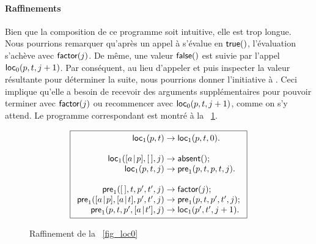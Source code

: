 \paragraph{Raffinements}

Bien que la composition de ce programme soit intuitive, elle est trop
longue. Nous pourrions remarquer qu'après un appel à
 s'évalue en \(\textsf{true}()\),
l'évaluation s'achève avec \(\textsf{factor}(j)\). De même, une valeur
\(\textsf{false}()\) est suivie par l'appel
\(\textsf{loc}_0(p,t,j+1)\). Par
conséquent, au lieu d'appeler  et puis inspecter la valeur
résultante pour déterminer la suite, nous pourrions donner
l'initiative à . Ceci implique qu'elle a besoin de recevoir
des arguments supplémentaires pour pouvoir terminer avec
\(\textsf{factor}(j)\) ou recommencer avec \(\textsf{loc}_0(p,t,j+1)\),
comme on s'y attend. Le programme correspondant est montré à la
\fig~\ref{fig_loc1}.
\begin{figure}[t]
\begin{equation*}
\boxed{%
\begin{array}{r@{\;}l@{\;}l}
\fun{loc}_1(p,t)   & \rightarrow & \fun{loc}_1(p,t,0).\\
\\
\fun{loc}_1(\cons{a}{p},\el,j) & \rightarrow & \fun{absent}();\\
\fun{loc}_1(p,t,j) & \rightarrow & \fun{pre}_1(p,t,p,t,j).\\
\\
\fun{pre}_1(\el,t,p',t',j) & \rightarrow & \fun{factor}(j);\\
\fun{pre}_1(\cons{a}{p},\cons{a}{t},p',t',j)
                   & \rightarrow & \fun{pre}_1(p,t,p',t',j);\\
\fun{pre}_1(p,t,p',\cons{a}{t'},j) & \rightarrow & \fun{loc}_1(p',t',j+1).
\end{array}}
\end{equation*}
\caption{Raffinement de la \fig~\vref{fig_loc0}
\label{fig_loc1}}
\end{figure}


